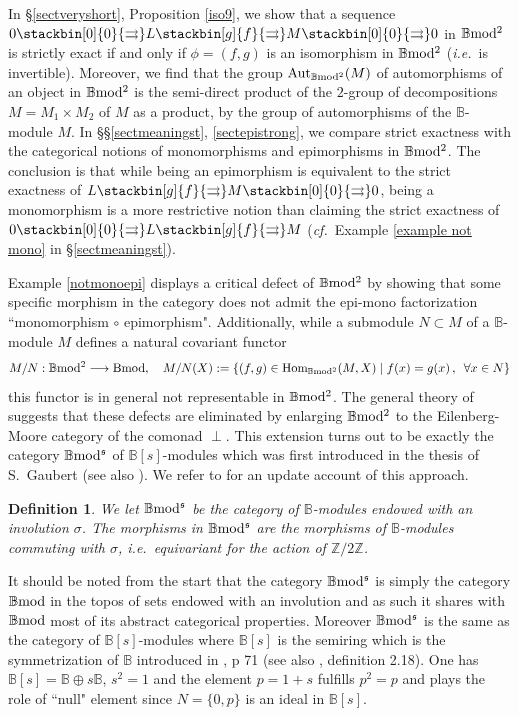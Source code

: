 \documentclass[12pt]{article}
\newtheorem{defn}[thm]{Definition}
\def\Aut{{\rm Aut}}
\def\Hom{{\rm Hom}}
\def\B{{\mathbb B}}
\def\Z{{\mathbb Z}}
\def\strg{strict }
\def\strgly{strictly }
\def\qqq{\,,\,~\forall}
\def\bs{{\B[s]}}
\newcommand{\ie}{{\it i.e.\/}\ }
\newcommand{\cf}{{\it cf.}}
\def\Hom {{\mbox{Hom}}}
\def\bmod{{\rm \B mod}}
\def\bm2{{\rm \B mod^2}}
\def\b2{{\rm \B mod^{\mathfrak s}}}
\begin{document}
	In \S \ref{sectveryshort}, Proposition \ref{iso9}, we show that a sequence $0 \stackbin[0]{0}{\rightrightarrows}L\stackbin[g]{f}{\rightrightarrows}M\stackbin[0]{0}{\rightrightarrows}0$ in $\bm2$ is  \strgly exact if and only if $\phi=(f,g)$ is an isomorphism in $\bm2$ (\ie is invertible). Moreover, we find that the  group $\Aut_\bm2(M)$ of automorphisms of an object in $\bm2$ is  the semi-direct product of the $2$-group  of decompositions $M=M_1\times M_2$ of $M$ as a product, by the group of automorphisms of the $\B$-module $M$. In \S\S \ref{sectmeaningst}, \ref{sectepistrong},  we compare \strg exactness with the categorical notions of   monomorphisms and epimorphisms in $\bm2$. The conclusion is that while being an epimorphism is equivalent to  the \strg exactness of $L\stackbin[g]{f}{\rightrightarrows}M\stackbin[0]{0}{\rightrightarrows}0$,  being a monomorphism is a more restrictive notion than claiming the \strg exactness of  $0\stackbin[0]{0}{\rightrightarrows}L\stackbin[g]{f}{\rightrightarrows}M$ (\cf~Example \ref{example not mono} in \S \ref{sectmeaningst}).
	
Example \ref{notmonoepi} displays a critical defect of $\bm2$ by showing that some specific morphism in the category does not admit the epi-mono factorization ``monomorphism $\circ$ epimorphism". Additionally, while a submodule $N\subset M$ of a $\B$-module $M$ defines a natural covariant functor 
$$
M/N:\bm2\longrightarrow {\rm Bmod},\quad M/N(X):=\{(f,g)\in \Hom_{\bm2}(M,X)\mid f(x)=g(x)\qqq x\in N\}
$$ this functor is in general not representable in $\bm2$. The general theory of \cite{barr}  suggests that these defects  are eliminated by  enlarging  $\bm2$ to the Eilenberg-Moore category of  the comonad $\perp$. This extension turns out to be exactly the category $\b2$ of $\bs$-modules which was first introduced in the thesis of S.~Gaubert \cite{Gaubert} (see also \cite{Akian}). We refer to  \cite{Rowen} for an update account of this approach. 
	 \begin{defn} We let $\b2$ be the category of $\B$-modules endowed with an involution $\sigma$. The morphisms in $\b2$ are the morphisms of $\B$-modules commuting with $\sigma$, \ie equivariant for the action of $\Z/2\Z$. 
\end{defn} 
It should be noted from the start that the category $\b2$ is simply the category $\bmod$ in the topos of sets endowed with an involution and as such it shares with $\bmod$ most of its abstract categorical properties. Moreover 
$\b2$ is the same as the category of $\bs$-modules where $\bs$ is the semiring which is the symmetrization of $\B$ introduced in \cite{Gaubert}, p 71 (see also \cite{Akian}, definition 2.18). One has $\bs=\B\oplus s \B$, $s^2=1$ and the element $p=1+s$ fulfills $p^2=p$ and plays the role of ``null" element since $N=\{0,p\}$ is an ideal in $\bs$.
 
\end{document}

